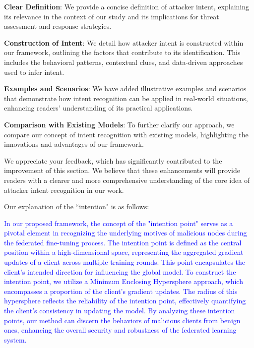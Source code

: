 \documentclass[a4paper,twoside,11pt,dvipsnames]{reviewresponse}
\begin{document}
\textbf{Clear Definition}: We provide a concise definition of attacker intent, explaining its relevance in the context of our study and its implications for threat assessment and response strategies.

\textbf{Construction of Intent}: We detail how attacker intent is constructed within our framework, outlining the factors that contribute to its identification. This includes the behavioral patterns, contextual clues, and data-driven approaches used to infer intent.

\textbf{Examples and Scenarios}: We have added illustrative examples and scenarios that demonstrate how intent recognition can be applied in real-world situations, enhancing readers’ understanding of its practical applications.

\textbf{Comparison with Existing Models}: To further clarify our approach, we compare our concept of intent recognition with existing models, highlighting the innovations and advantages of our framework.

We appreciate your feedback, which has significantly contributed to the improvement of this section. We believe that these enhancements will provide readers with a clearer and more comprehensive understanding of the core idea of attacker intent recognition in our work.


Our explanation of the ``intention" is as follows:

\textcolor{blue}{In our proposed framework, the concept of the "intention point" serves as a pivotal element in recognizing the underlying motives of malicious nodes during the federated fine-tuning process. The intention point is defined as the central position within a high-dimensional space, representing the aggregated gradient updates of a client across multiple training rounds. This point encapsulates the client's intended direction for influencing the global model. To construct the intention point, we utilize a Minimum Enclosing Hypersphere approach, which encompasses a proportion of the client’s gradient updates. The radius of this hypersphere reflects the reliability of the intention point, effectively quantifying the client's consistency in updating the model. By analyzing these intention points, our method can discern the behaviors of malicious clients from benign ones, enhancing the overall security and robustness of the federated learning system.}
\end{document}
